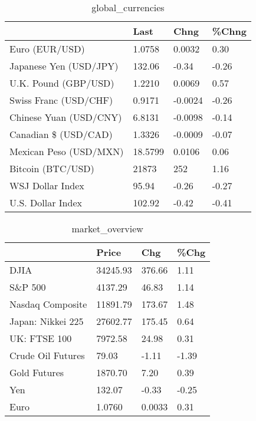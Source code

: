 \documentclass{article}%
\begin{document}
%


\begin{table}[htbp]%
\caption{global\_currencies}%
\centering%
\begin{adjustbox}{width=1\textwidth}%
\begin{tabular}{llll}
\toprule
                       &    Last &    Chng & \%Chng \\
\midrule
        Euro (EUR/USD) &  1.0758 &  0.0032 &  0.30 \\
Japanese Yen (USD/JPY) &  132.06 &   -0.34 & -0.26 \\
  U.K. Pound (GBP/USD) &  1.2210 &  0.0069 &  0.57 \\
 Swiss Franc (USD/CHF) &  0.9171 & -0.0024 & -0.26 \\
Chinese Yuan (USD/CNY) &  6.8131 & -0.0098 & -0.14 \\
  Canadian \$ (USD/CAD) &  1.3326 & -0.0009 & -0.07 \\
Mexican Peso (USD/MXN) & 18.5799 &  0.0106 &  0.06 \\
     Bitcoin (BTC/USD) &   21873 &     252 &  1.16 \\
      WSJ Dollar Index &   95.94 &   -0.26 & -0.27 \\
     U.S. Dollar Index &  102.92 &   -0.42 & -0.41 \\
\bottomrule
\end{tabular}
%
\end{adjustbox}%
\end{table}

%


\begin{table}[htbp]%
\caption{market\_overview}%
\centering%
\begin{adjustbox}{width=1\textwidth}%
\begin{tabular}{llll}
\toprule
                  &    Price &    Chg &  \%Chg \\
\midrule
             DJIA & 34245.93 & 376.66 &  1.11 \\
          S\&P 500 &  4137.29 &  46.83 &  1.14 \\
 Nasdaq Composite & 11891.79 & 173.67 &  1.48 \\
Japan: Nikkei 225 & 27602.77 & 175.45 &  0.64 \\
     UK: FTSE 100 &  7972.58 &  24.98 &  0.31 \\
Crude Oil Futures &    79.03 &  -1.11 & -1.39 \\
     Gold Futures &  1870.70 &   7.20 &  0.39 \\
              Yen &   132.07 &  -0.33 & -0.25 \\
             Euro &   1.0760 & 0.0033 &  0.31 \\
\bottomrule
\end{tabular}
%
\end{adjustbox}%
\end{table}

%
\end{document}

